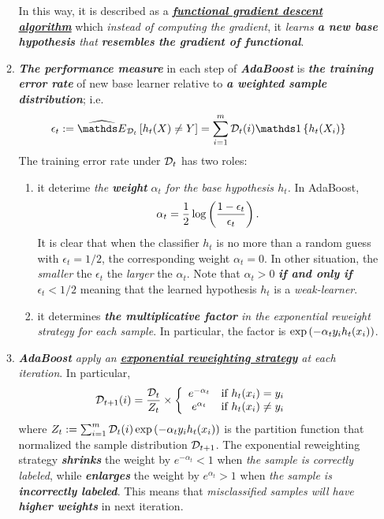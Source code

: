 \documentclass[11pt]{article}
\begin{document}
\begin{itemize}
\begin{remark}
\begin{enumerate}
In this way, it is described as a \underline{\emph{\textbf{functional gradient descent algorithm}}} which \emph{instead of computing the gradient}, it \emph{learns \textbf{a new base hypothesis} that \textbf{resembles} \textbf{the gradient of functional}}.


\item \emph{\textbf{The performance measure}} in each step of \emph{\textbf{AdaBoost}} is \emph{\textbf{the training error rate}} of new base learner relative to \emph{\textbf{a weighted sample distribution}}; i.e.
\begin{align*}
\epsilon_t := \Em{\cD_t}{h_t(X) \neq Y} = \sum_{i=1}^{m}\cD_t(i) \ind{h_t(X_i)}
\end{align*} The training error rate under ${\mathcal D}_t$ has two roles:
\begin{enumerate}
\item it deterime \emph{the \textbf{weight} $\alpha_t$ for the base hypothesis $h_t$.} In AdaBoost, 
\begin{align*}
\alpha_t = \frac{1}{2}\log\left(\frac{1 - \epsilon_t}{\epsilon_t}\right).
\end{align*} It is clear that when the classifier $h_t$ is no more than a random guess with $\epsilon_t = 1/2$, the corresponding weight $\alpha_t = 0$. In other situation, the \emph{smaller} the $\epsilon_t$ the \emph{larger} the $\alpha_t$. Note that $\alpha_t >0$ \emph{\textbf{if and only if}} $\epsilon_t < 1/2$ meaning that the learned hypothesis $h_t$ is a \emph{weak-learner}.

\item it determines \emph{\textbf{the multiplicative factor} in the exponential reweight strategy for each sample}. In particular, the factor is $\exp\left(-\alpha_t y_i h_t(x_i)\right)$.
\end{enumerate}

\item \emph{\textbf{AdaBoost} apply an \textbf{\underline{exponential reweighting strategy}} at each iteration}. In particular, 
\begin{align*}
{\mathcal D}_{t+1}(i) &= \frac{{\mathcal D}_t}{Z_t} \times \left\{\begin{array}{cc}
e^{-\alpha_t} &\text{if }h_t(x_i) = y_i \\
e^{\alpha_t} &\text{if }h_t(x_i) \neq y_i 
\end{array}
\right.
\end{align*} where $Z_t := \sum_{i=1}^{m}{\mathcal D}_t(i)\exp\left(-\alpha_t y_i h_t(x_i)\right)$ is the partition function that normalized the sample distribution ${\mathcal D}_{t+1}$. The exponential reweighting strategy \emph{\textbf{shrinks}} the weight by $e^{-\alpha_t} < 1$ when \emph{the sample is correctly labeled}, while \emph{\textbf{enlarges}} the weight by $e^{\alpha_t} > 1$ when \emph{the sample is \textbf{incorrectly labeled}}. This means that \emph{misclassified samples will have \textbf{higher weights}} in next iteration.


\end{enumerate}
\end{remark}
\end{itemize}
\end{document}
